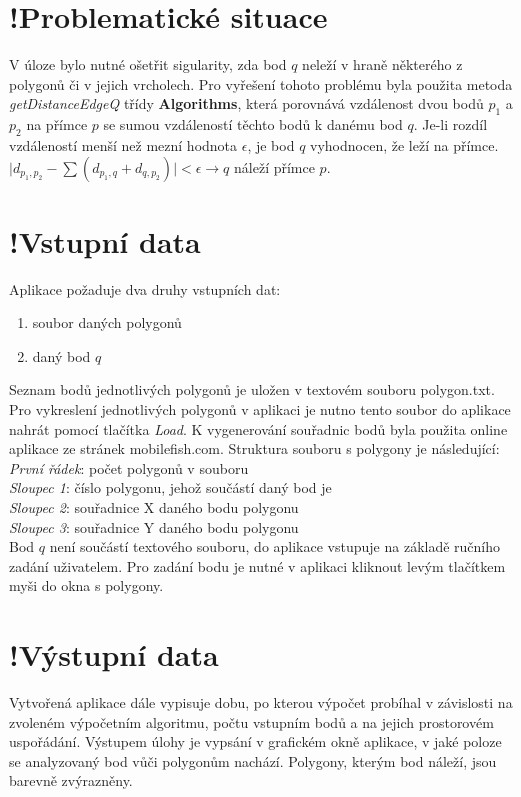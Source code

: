 \documentclass[a4paper, 12pt]{article}
\begin{document}
\section{!Problematické situace}
V úloze bylo nutné ošetřit sigularity, zda bod $q$ neleží v hraně některého z polygonů či v jejich vrcholech. Pro vyřešení tohoto problému byla použita metoda \textsl{getDistanceEdgeQ} třídy \textbf{Algorithms}, která porovnává vzdálenost dvou bodů $p_1$ a $p_2$ na přímce $p$ se sumou vzdáleností těchto bodů k danému bod $q$. Je-li rozdíl vzdáleností menší než mezní hodnota $\epsilon$, je bod $q$ vyhodnocen, že leží na přímce.\\

$\mid d_{p_1,p_2} - \sum(d_{p_1,q} + d_{q,p_2}) \mid  < \epsilon \rightarrow q$ náleží přímce $p$.

\section{!Vstupní data}
Aplikace požaduje dva druhy vstupních dat:

\begin{enumerate}
\item soubor daných polygonů
\item daný bod $q$
\end{enumerate}

Seznam bodů jednotlivých polygonů je uložen v textovém souboru polygon.txt. Pro vykreslení jednotlivých polygonů v aplikaci je nutno tento soubor do aplikace nahrát pomocí tlačítka \textsl{Load}. K vygenerování souřadnic bodů byla použita online aplikace ze stránek mobilefish.com. Struktura souboru s polygony je následující:\\

\noindent
\textsl{První řádek}: počet polygonů v souboru\\
\textsl{Sloupec 1}: číslo polygonu, jehož součástí daný bod je\\
\textsl{Sloupec 2}: souřadnice X daného bodu polygonu\\
\textsl{Sloupec 3}: souřadnice Y daného bodu polygonu\\

Bod $q$ není součástí textového souboru, do aplikace vstupuje na základě ručního zadání uživatelem. Pro zadání bodu je nutné v aplikaci kliknout levým tlačítkem myši do okna s polygony.

\section{!Výstupní data}
Vytvořená aplikace dále vypisuje dobu, po kterou  výpočet probíhal v závislosti na zvoleném výpočetním algoritmu, počtu vstupním bodů a na jejich prostorovém uspořádání.
Výstupem úlohy je vypsání v grafickém okně aplikace, v jaké poloze se analyzovaný bod vůči polygonům nachází. Polygony, kterým bod náleží, jsou barevně zvýrazněny.
\end{document}
